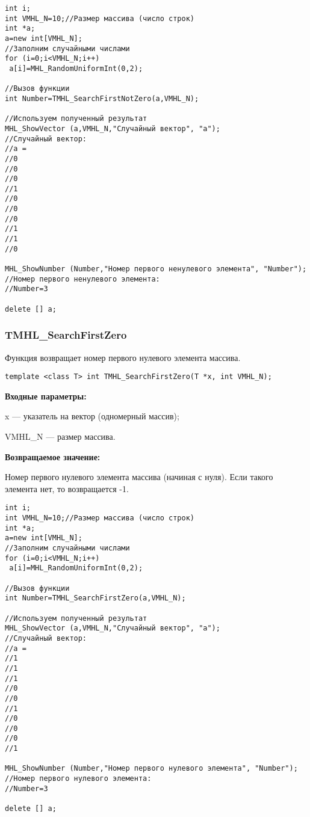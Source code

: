 \documentclass[a4paper,12pt]{article}
\begin{document}
\begin{lstlisting}[label=code_use_TMHL_SearchFirstNotZero,caption=Пример использования]
int i;
int VMHL_N=10;//Размер массива (число строк)
int *a;
a=new int[VMHL_N];
//Заполним случайными числами
for (i=0;i<VMHL_N;i++)
 a[i]=MHL_RandomUniformInt(0,2);

//Вызов функции
int Number=TMHL_SearchFirstNotZero(a,VMHL_N);

//Используем полученный результат
MHL_ShowVector (a,VMHL_N,"Случайный вектор", "a");
//Случайный вектор:
//a =
//0
//0
//0
//1
//0
//0
//0
//1
//1
//0

MHL_ShowNumber (Number,"Номер первого ненулевого элемента", "Number");
//Номер первого ненулевого элемента:
//Number=3

delete [] a;
\end{lstlisting}

\subsubsection{TMHL\_SearchFirstZero}\label{TMHL_SearchFirstZero}

Функция возвращает номер первого нулевого элемента массива.


\begin{lstlisting}[label=code_syntax_TMHL_SearchFirstZero,caption=Синтаксис]
template <class T> int TMHL_SearchFirstZero(T *x, int VMHL_N);
\end{lstlisting}

\textbf{Входные параметры:}

 x --- указатель на вектор (одномерный массив);
 
 VMHL\_N --- размер массива.

\textbf{Возвращаемое значение:}

 Номер первого нулевого элемента массива (начиная с нуля). Если такого элемента нет, то возвращается -1.


\begin{lstlisting}[label=code_use_TMHL_SearchFirstZero,caption=Пример использования]
int i;
int VMHL_N=10;//Размер массива (число строк)
int *a;
a=new int[VMHL_N];
//Заполним случайными числами
for (i=0;i<VMHL_N;i++)
 a[i]=MHL_RandomUniformInt(0,2);

//Вызов функции
int Number=TMHL_SearchFirstZero(a,VMHL_N);

//Используем полученный результат
MHL_ShowVector (a,VMHL_N,"Случайный вектор", "a");
//Случайный вектор:
//a =
//1
//1
//1
//0
//0
//1
//0
//0
//0
//1

MHL_ShowNumber (Number,"Номер первого нулевого элемента", "Number");
//Номер первого нулевого элемента:
//Number=3

delete [] a;
\end{lstlisting}
\end{document}
